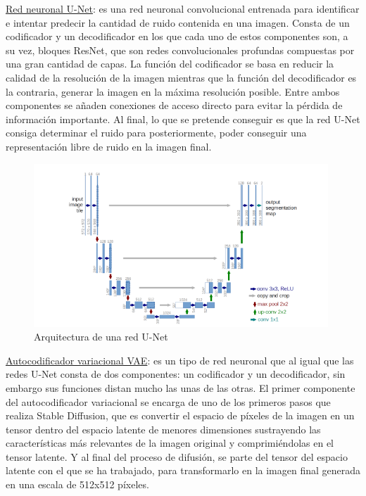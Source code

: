 \underline{Red neuronal U-Net}: es una red neuronal convolucional entrenada para identificar e intentar predecir la cantidad de ruido contenida en una imagen. Consta de un codificador y un decodificador en los que cada uno de estos componentes son, a su vez, bloques ResNet, que son redes convolucionales profundas compuestas por una gran cantidad de capas. La función del codificador se basa en reducir la calidad de la resolución de la imagen mientras que  la función del decodificador es la contraria, generar la imagen en la máxima resolución posible. Entre ambos componentes se añaden conexiones de acceso directo para evitar la pérdida de información importante. Al final, lo que se pretende conseguir es que la red U-Net consiga determinar el ruido para posteriormente, poder conseguir una representación libre de ruido en la imagen final.

\begin{figure}[h]
	\centering
	\includegraphics[width = 0.5
	\textwidth]{Imagenes/Vectorial/u-net.png}
	\caption{Arquitectura de una red U-Net}
	\label{fig:unet}
\end{figure}

\underline{Autocodificador variacional VAE}: es un tipo de red neuronal que al igual que las redes U-Net consta de dos componentes: un codificador y un decodificador, sin embargo sus funciones distan mucho las unas de las otras. El primer componente del autocodificador variacional se encarga de uno de los primeros pasos que realiza Stable Diffusion, que es convertir el espacio de píxeles de la imagen en un tensor dentro del espacio latente de menores dimensiones sustrayendo las características más relevantes de la imagen original y comprimiéndolas en el tensor latente. Y al final del proceso de difusión, se parte del tensor del espacio latente con el que se ha trabajado, para transformarlo en la imagen final generada en una escala de 512x512 píxeles.

